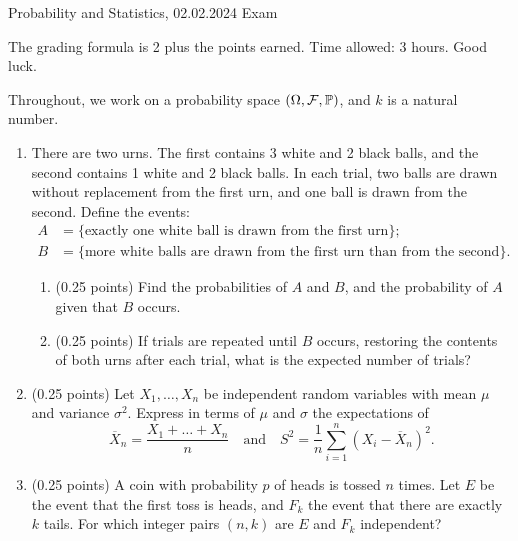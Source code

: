 \documentclass[a4paper]{report}
\begin{document}
\noindent Probability and Statistics, 02.02.2024 \hfill Exam

\hrulefill

\begin{it}
The grading formula is 2 plus the points earned. Time allowed: 3 hours. Good luck.



Throughout, we work on a probability space $(\Omega,{\mathcal{F}},\mathbb P)$, and
$k$ is a natural number.


\end{it}


\begin{problem}
\begin{enumerate}
\item
There are two urns. The first contains 3 white and 2 black balls, and the second contains 1 white
and 2 black balls. In each trial, two balls are drawn without replacement from the first urn,
and one ball is drawn from the second. Define the events:
\begin{align*}
A &= \{\text{exactly one white ball is drawn from the first urn}\};\\
B &= \{\text{more white balls are drawn from the first urn than from the second}\}.
\end{align*}
\begin{enumerate}

    \item (0.25 points) Find the probabilities of $A$ and $B$, and the probability of $A$ given that $B$ occurs.
    \item (0.25 points)
    If trials are repeated until $B$ occurs, restoring the contents
of both urns after each trial, what is the expected number of trials?
\end{enumerate}
\item (0.25 points)
Let $X_1,\dots,X_n$ be independent
random variables with mean $\mu$
and variance $\sigma^2$. Express in terms of
$\mu$ and $\sigma$ the expectations of
 \[
 \overline{X}_n = \frac{X_1 + \dots+ X_n}{n}
 \quad
\text{and}
 \quad
 S^2 = \frac{1}{n}\sum_{i=1}^n\left(X_i - \overline{X}_n\right)^2.
 \]

\item (0.25 points)
A coin with probability $p$ of heads is tossed $n$ times. Let $E$ be the event that the first toss is heads, and $F_k$ the event that there are exactly $k$ tails. For which integer pairs $(n,k)$ are $E$ and $F_k$ independent?

\end{enumerate}
\end{problem}
\end{document}
